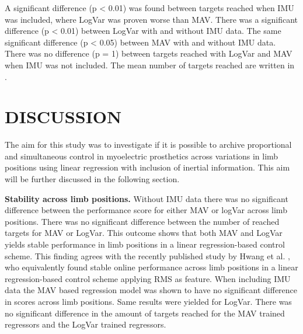 \begin{multicols}{2}
	
	
	A significant difference (p < 0.01) was found between targets reached when IMU was included, where LogVar was proven worse than MAV. There was a significant difference (p < 0.01) between LogVar with and without IMU data. The same significant difference (p < 0.05) between MAV with and without IMU data. There was no difference (p = 1) between targets reached with LogVar and MAV when IMU was not included. The mean number of targets reached are written in .
	
\section*{DISCUSSION}%
	
	The aim for this study was to investigate if it is possible to archive proportional and simultaneous control in myoelectric prosthetics across variations in limb positions using linear regression with inclusion of inertial information. This aim will be further discussed in the following section.
	
%		
\textbf{Stability across limb positions.} Without IMU data there was no significant difference between the performance score for either MAV or logVar across limb positions. There was no significant difference between the number of reached targets for MAV or LogVar. This outcome shows that both MAV and LogVar yields stable performance in limb positions in a linear regression-based control scheme. This finding agrees with the recently published study by Hwang et al. \cite{Hwang2017}, who equivalently found stable online performance across limb positions in a linear regression-based control scheme applying RMS as feature.
When including IMU data the MAV based regression model was shown to have no significant difference in scores across limb positions. Same results were yielded for LogVar. There was no significant difference in the amount of targets reached for the MAV trained regressors and the LogVar trained regressors. 


\end{multicols}
